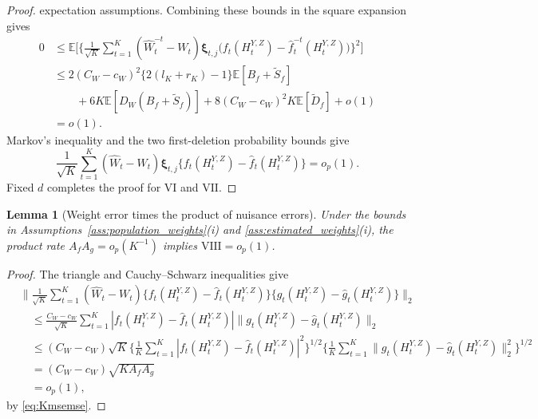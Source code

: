\documentclass[12pt]{article}
\def\E{\mathbb{E}}
\newtheorem{lemma}[theorem]{Lemma}
\numberwithin{equation}{section}
\begin{document}
\begin{proof}
expectation assumptions.
Combining these bounds in the square expansion gives
\begin{align*}
0
&\leq
\E\Bigg[
\Big\{\frac1{\sqrt K}\sum_{t=1}^K
(\hat W_t^{-t}-W_t)\boldsymbol\xi_{t,j}
\big(f_t(H_t^{Y,Z})-\hat f_t^{-t}(H_t^{Y,Z})\big)
\Big\}^2
\Bigg]\\
&\leq
2(C_W-c_W)^2\{2(l_K+r_K)-1\}\E[B_f+\tilde S_f]\\
&\qquad{}+
6K\E[D_W(B_f+\tilde S_f)]
+8(C_W-c_W)^2K\E[\tilde D_f]+o(1)\\
&=o(1).
\end{align*}
Markov's inequality and the two first-deletion probability
bounds give
\begin{equation}
\label{eq:termVII-converge}
\frac1{\sqrt K}\sum_{t=1}^K
(\hat W_t-W_t)\boldsymbol\xi_{t,j}
\big\{f_t(H_t^{Y,Z})-\hat f_t(H_t^{Y,Z})\big\}
=o_p(1).
\end{equation}
Fixed \(d\) completes the proof for \(\mathrm{VI}\) and
\(\mathrm{VII}\).
\end{proof}


\begin{lemma}[Weight error times the product of nuisance errors]
\label{lem:weight-product-remainder}
Under the bounds in Assumptions~\ref{ass:population_weights}(i) and
\ref{ass:estimated_weights}(i), the product rate
\(A_fA_g=o_p(K^{-1})\) implies \(\mathrm{VIII}=o_p(1)\).
\end{lemma}

\begin{proof}
The triangle and Cauchy--Schwarz inequalities give
\begin{equation}
\label{eq:termVIII-product-bound}
\begin{aligned}
&\Big\|\frac1{\sqrt K}\sum_{t=1}^K(\hat W_t-W_t)
\big\{f_t(H_t^{Y,Z})-\hat f_t(H_t^{Y,Z})\big\}
\big\{g_t(H_t^{Y,Z})-\hat g_t(H_t^{Y,Z})\big\}\Big\|_2\\
&\quad\leq\frac{C_W-c_W}{\sqrt K}\sum_{t=1}^K
|f_t(H_t^{Y,Z})-\hat f_t(H_t^{Y,Z})|
\|g_t(H_t^{Y,Z})-\hat g_t(H_t^{Y,Z})\|_2\\
&\quad\leq(C_W-c_W)\sqrt K
\Big\{\frac1K\sum_{t=1}^K|f_t(H_t^{Y,Z})-\hat f_t(H_t^{Y,Z})|^2\Big\}^{1/2}
\Big\{\frac1K\sum_{t=1}^K\|g_t(H_t^{Y,Z})-\hat g_t(H_t^{Y,Z})\|_2^2\Big\}^{1/2}\\
&\quad=(C_W-c_W)\sqrt{K A_fA_g}\\
&\quad =o_p(1),
\end{aligned}
\end{equation}
by \eqref{eq:Kmsemse}.
\end{proof}
\end{document}
